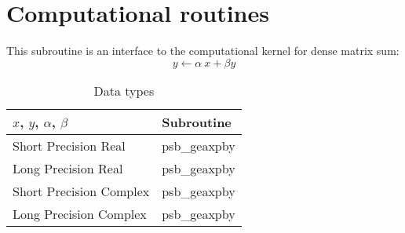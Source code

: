 \section{Computational routines}

%
%

This subroutine is an interface to the computational kernel for
dense matrix sum:
\[ y \leftarrow  \alpha\> x+ \beta y \] 


\begin{table}[h]
\begin{center}
\begin{tabular}{ll}
\hline
$x$, $y$, $\alpha$, $\beta$ & {\bf Subroutine}\\
\hline
Short Precision Real & psb\_geaxpby \\
Long Precision Real & psb\_geaxpby \\
Short Precision Complex & psb\_geaxpby \\
Long Precision Complex & psb\_geaxpby \\
\hline
\end{tabular}
\end{center}
\caption{Data types\label{tab:f90axpby}}
\end{table}

